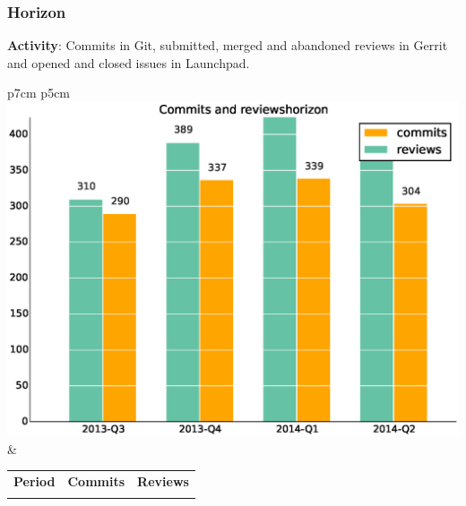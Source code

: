 \documentclass[a4wide,11pt]{report}
\begin{document}
 \newpage 
 \subsubsection{Horizon}

\textbf{Activity}: Commits in Git, submitted, merged and abandoned reviews in Gerrit and opened and closed issues in Launchpad.

\begin{tabular}{p{7cm} p{5cm}}
    \vspace{0pt} 
    \includegraphics[scale=.35]{figs/commitshorizon.eps}
    & 
    \vspace{0pt}
    \begin{tabular}{l|r|r|}%
    \bfseries Period & \bfseries Commits & \bfseries Reviews %
    \csvreader[head to column names]{data/commitshorizon.csv}{}%
    {\\ & \commits & \submitted}
    \end{tabular}
\end{tabular}
\end{document}

